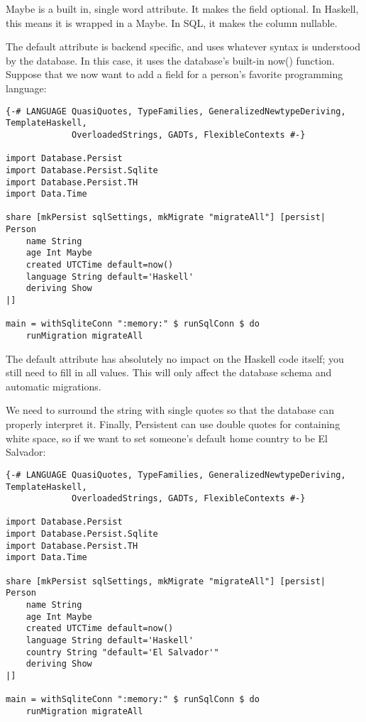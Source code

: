 Maybe is a built in, single word attribute. It makes the field optional. In Haskell, this means it is wrapped in a Maybe. In SQL, it makes the column nullable.

The default attribute is backend specific, and uses whatever syntax is understood by the database. In this case, it uses the database's built-in now() function. Suppose that we now want to add a field for a person's favorite programming language:

\begin{lstlisting}
{-# LANGUAGE QuasiQuotes, TypeFamilies, GeneralizedNewtypeDeriving, TemplateHaskell,
             OverloadedStrings, GADTs, FlexibleContexts #-}

import Database.Persist
import Database.Persist.Sqlite
import Database.Persist.TH
import Data.Time

share [mkPersist sqlSettings, mkMigrate "migrateAll"] [persist|
Person
    name String
    age Int Maybe
    created UTCTime default=now()
    language String default='Haskell'
    deriving Show
|]

main = withSqliteConn ":memory:" $ runSqlConn $ do
    runMigration migrateAll
\end{lstlisting}%

The default attribute has absolutely no impact on the Haskell code itself; you still need to fill in all values. This will only affect the database schema and automatic migrations.

We need to surround the string with single quotes so that the database can properly interpret it. Finally, Persistent can use double quotes for containing white space, so if we want to set someone's default home country to be El Salvador:

\begin{lstlisting}
{-# LANGUAGE QuasiQuotes, TypeFamilies, GeneralizedNewtypeDeriving, TemplateHaskell,
             OverloadedStrings, GADTs, FlexibleContexts #-}

import Database.Persist
import Database.Persist.Sqlite
import Database.Persist.TH
import Data.Time

share [mkPersist sqlSettings, mkMigrate "migrateAll"] [persist|
Person
    name String
    age Int Maybe
    created UTCTime default=now()
    language String default='Haskell'
    country String "default='El Salvador'"
    deriving Show
|]

main = withSqliteConn ":memory:" $ runSqlConn $ do
    runMigration migrateAll
\end{lstlisting}%
 

